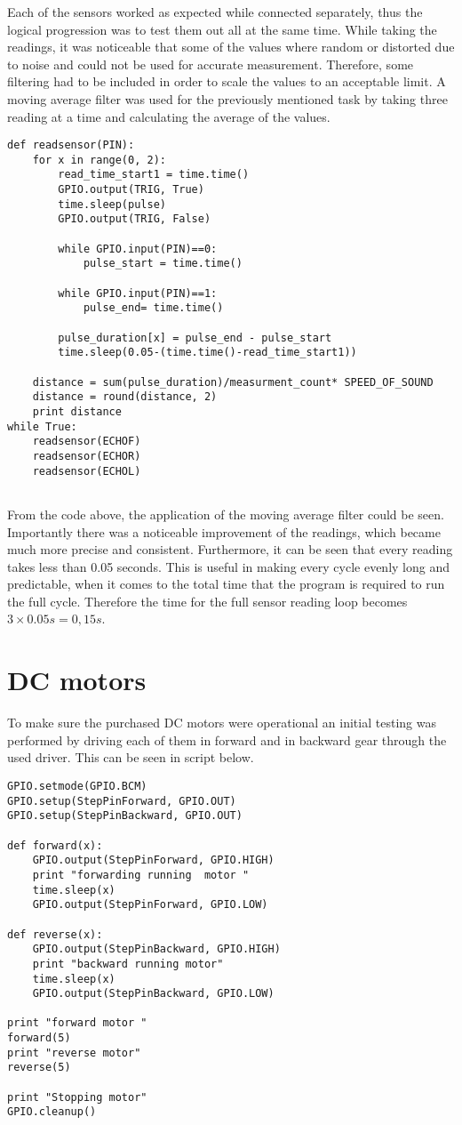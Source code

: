 Each of the sensors worked as expected while connected separately, thus the logical progression was to test them out all at the same time.
While taking the readings, it was noticeable that some of the values where random or distorted due to noise and could not be used for accurate measurement. Therefore, some filtering had to be included in order to scale the values to an acceptable limit. A moving average filter was used for the previously mentioned task by taking three reading at a time and calculating the average of the values. 

\begin{lstlisting}
def readsensor(PIN):
	for x in range(0, 2):
		read_time_start1 = time.time()
		GPIO.output(TRIG, True)
		time.sleep(pulse)
		GPIO.output(TRIG, False)

		while GPIO.input(PIN)==0:
			pulse_start = time.time()

		while GPIO.input(PIN)==1:
			pulse_end= time.time()

		pulse_duration[x] = pulse_end - pulse_start
		time.sleep(0.05-(time.time()-read_time_start1))

	distance = sum(pulse_duration)/measurment_count* SPEED_OF_SOUND
	distance = round(distance, 2)
	print distance
while True:
	readsensor(ECHOF)
	readsensor(ECHOR)
	readsensor(ECHOL)
	
\end{lstlisting}

From the code above, the application of the moving average filter could be seen. Importantly there was a noticeable improvement of the readings, which became much more precise and consistent.
Furthermore, it can be seen that every reading takes less than 0.05 seconds. This is useful in making every cycle evenly long and predictable, when it comes to the total time that the program is required to run the full cycle. Therefore the time for the full sensor reading loop becomes $3\times0.05s=0,15s$.

\section{DC motors}
To make sure the purchased DC motors were operational an initial testing was performed by driving each of them in forward and in backward gear through the used driver. This can be seen in script below.

\begin{lstlisting}
GPIO.setmode(GPIO.BCM)
GPIO.setup(StepPinForward, GPIO.OUT)
GPIO.setup(StepPinBackward, GPIO.OUT)

def forward(x):
    GPIO.output(StepPinForward, GPIO.HIGH)
    print "forwarding running  motor "
    time.sleep(x)
    GPIO.output(StepPinForward, GPIO.LOW)

def reverse(x):
    GPIO.output(StepPinBackward, GPIO.HIGH)
    print "backward running motor"
    time.sleep(x)
    GPIO.output(StepPinBackward, GPIO.LOW)

print "forward motor "
forward(5)
print "reverse motor"
reverse(5)

print "Stopping motor"
GPIO.cleanup()

\end{lstlisting}

